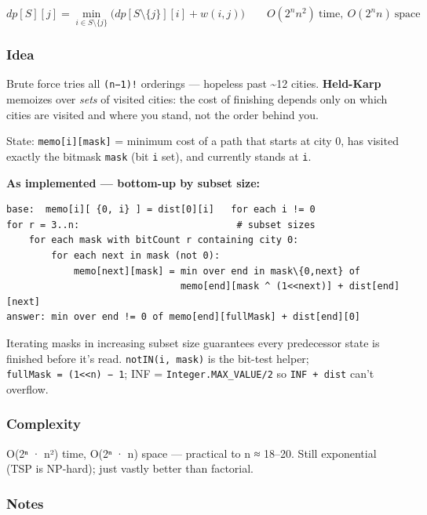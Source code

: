 \documentclass[
  10pt,
  letterpaper,
  onecolumn]{article}
\begin{document}
\begin{equation*}
dp[S][j]=\min_{i\in S\setminus\{j\}}\bigl(dp[S\setminus\{j\}][i]+w(i,j)\bigr)
\qquad O(2^{n}n^{2})\ \text{time},\ O(2^{n}n)\ \text{space}
\end{equation*}

\hypertarget{idea-17}{%
\subsubsection{Idea}\label{idea-17}}

Brute force tries all \texttt{(n−1)!} orderings --- hopeless past
\textasciitilde12 cities. \textbf{Held-Karp} memoizes over \emph{sets}
of visited cities: the cost of finishing depends only on which cities
are visited and where you stand, not the order behind you.

State: \texttt{memo{[}i{]}{[}mask{]}} = minimum cost of a path that
starts at city 0, has visited exactly the bitmask \texttt{mask} (bit
\texttt{i} set), and currently stands at \texttt{i}.

\textbf{As implemented --- bottom-up by subset size:}

\begin{verbatim}
base:  memo[i][ {0, i} ] = dist[0][i]   for each i != 0
for r = 3..n:                            # subset sizes
    for each mask with bitCount r containing city 0:
        for each next in mask (not 0):
            memo[next][mask] = min over end in mask\{0,next} of
                               memo[end][mask ^ (1<<next)] + dist[end][next]
answer: min over end != 0 of memo[end][fullMask] + dist[end][0]
\end{verbatim}

Iterating masks in increasing subset size guarantees every predecessor
state is finished before it's read. \texttt{notIN(i,\ mask)} is the
bit-test helper; \texttt{fullMask\ =\ (1\textless{}\textless{}n)\ −\ 1};
INF = \texttt{Integer.MAX\_VALUE/2} so \texttt{INF\ +\ dist} can't
overflow.

\hypertarget{complexity-17}{%
\subsubsection{Complexity}\label{complexity-17}}

O(2ⁿ · n²) time, O(2ⁿ · n) space --- practical to n ≈ 18--20. Still
exponential (TSP is NP-hard); just vastly better than factorial.

\hypertarget{notes-15}{%
\subsubsection{Notes}\label{notes-15}}
\end{document}
